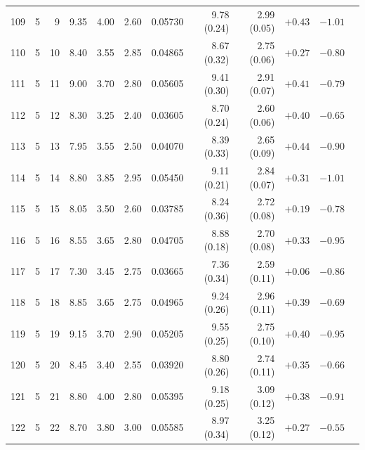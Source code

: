 \begin{longtable}{@{}rrrrrrrrrrrr@{}}
109 & 5 & 9 & \num{9.35} & \num{4.00} & \num{2.60} & \num{0.05730} & \num{9.78} (\num{0.24}) & \num{2.99} (\num{0.05}) & $+\num{0.43}$ & $-\num{1.01}$ &  \\
110 & 5 & 10 & \num{8.40} & \num{3.55} & \num{2.85} & \num{0.04865} & \num{8.67} (\num{0.32}) & \num{2.75} (\num{0.06}) & $+\num{0.27}$ & $-\num{0.80}$ &  \\
111 & 5 & 11 & \num{9.00} & \num{3.70} & \num{2.80} & \num{0.05605} & \num{9.41} (\num{0.30}) & \num{2.91} (\num{0.07}) & $+\num{0.41}$ & $-\num{0.79}$ &  \\
112 & 5 & 12 & \num{8.30} & \num{3.25} & \num{2.40} & \num{0.03605} & \num{8.70} (\num{0.24}) & \num{2.60} (\num{0.06}) & $+\num{0.40}$ & $-\num{0.65}$ &  \\
113 & 5 & 13 & \num{7.95} & \num{3.55} & \num{2.50} & \num{0.04070} & \num{8.39} (\num{0.33}) & \num{2.65} (\num{0.09}) & $+\num{0.44}$ & $-\num{0.90}$ &  \\
114 & 5 & 14 & \num{8.80} & \num{3.85} & \num{2.95} & \num{0.05450} & \num{9.11} (\num{0.21}) & \num{2.84} (\num{0.07}) & $+\num{0.31}$ & $-\num{1.01}$ &  \\
115 & 5 & 15 & \num{8.05} & \num{3.50} & \num{2.60} & \num{0.03785} & \num{8.24} (\num{0.36}) & \num{2.72} (\num{0.08}) & $+\num{0.19}$ & $-\num{0.78}$ &  \\
116 & 5 & 16 & \num{8.55} & \num{3.65} & \num{2.80} & \num{0.04705} & \num{8.88} (\num{0.18}) & \num{2.70} (\num{0.08}) & $+\num{0.33}$ & $-\num{0.95}$ &  \\
117 & 5 & 17 & \num{7.30} & \num{3.45} & \num{2.75} & \num{0.03665} & \num{7.36} (\num{0.34}) & \num{2.59} (\num{0.11}) & $+\num{0.06}$ & $-\num{0.86}$ &  \\
118 & 5 & 18 & \num{8.85} & \num{3.65} & \num{2.75} & \num{0.04965} & \num{9.24} (\num{0.26}) & \num{2.96} (\num{0.11}) & $+\num{0.39}$ & $-\num{0.69}$ &  \\
119 & 5 & 19 & \num{9.15} & \num{3.70} & \num{2.90} & \num{0.05205} & \num{9.55} (\num{0.25}) & \num{2.75} (\num{0.10}) & $+\num{0.40}$ & $-\num{0.95}$ &  \\
120 & 5 & 20 & \num{8.45} & \num{3.40} & \num{2.55} & \num{0.03920} & \num{8.80} (\num{0.26}) & \num{2.74} (\num{0.11}) & $+\num{0.35}$ & $-\num{0.66}$ &  \\
121 & 5 & 21 & \num{8.80} & \num{4.00} & \num{2.80} & \num{0.05395} & \num{9.18} (\num{0.25}) & \num{3.09} (\num{0.12}) & $+\num{0.38}$ & $-\num{0.91}$ &  \\
122 & 5 & 22 & \num{8.70} & \num{3.80} & \num{3.00} & \num{0.05585} & \num{8.97} (\num{0.34}) & \num{3.25} (\num{0.12}) & $+\num{0.27}$ & $-\num{0.55}$ &  \\

\end{longtable}
